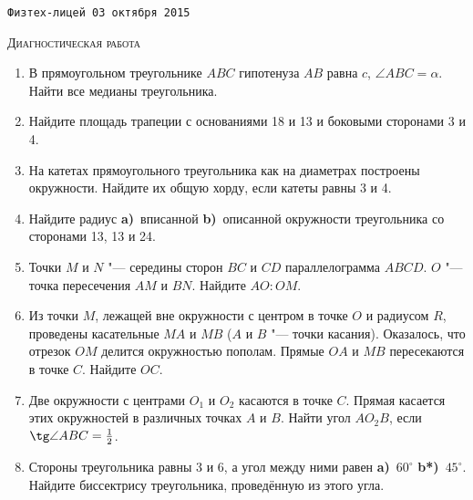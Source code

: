 \documentclass[a4paper, landscape, twocolumn, 11pt]{article}
\begin{document}
\newpage


\begin{center}

\noindent\texttt{Физтех-лицей \hfill 03 октября 2015}

\vspace{-1ex}
\noindent\rule{0pt}{0pt}\hrulefill\rule{0pt}{0pt}

\bigskip

\textsc{\large Диагностическая работа}

\end{center}


\begin{enumerate}[\bf 1.]

\item В прямоугольном треугольнике $ABC$ гипотенуза $AB$ равна $c$, $\angle ABC = \alpha$. Найти все медианы треугольника.

\item Найдите площадь трапеции с основаниями 18 и 13 и боковыми сторонами 3 и 4.

\item На катетах прямоугольного треугольника как на диаметрах построены окружности. Найдите их общую хорду, если катеты равны 3 и 4.

\item Найдите радиус \textbf{a)}~вписанной \textbf{b)}~описанной окружности треугольника со сторонами 13, 13 и 24.

\item Точки $M$ и $N$ "--- середины сторон $BC$ и $CD$ параллелограмма $ABCD$. $O$ "--- точка пересечения $AM$ и $BN$. Найдите $AO:OM$.

\item Из точки $M$, лежащей вне окружности с центром в точке $O$ и радиусом $R$, проведены касательные $MA$ и $MB$ ($A$ и $B$ "--- точки касания). Оказалось, что отрезок $OM$ делится окружностью пополам. Прямые $OA$ и $MB$ пересекаются в точке $C$. Найдите $OC$.

\item Две окружности с центрами $O_1$ и $O_2$ касаются в точке $C$. Прямая касается этих окружностей в различных точках $A$ и $B$. Найти угол $AO_2B$, если $\tg \angle ABC = \frac12$.

\item Стороны треугольника равны 3 и 6, а угол между ними равен \textbf{a)}~$60^\circ$ \textbf{b*)}~$45^\circ$. Найдите биссектрису треугольника, проведённую из этого угла.

\end{enumerate}
\end{document}
